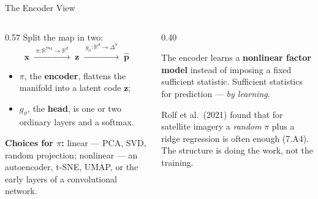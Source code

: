 \begin{frame}{The Encoder View}
\begin{columns}[T]
\begin{column}{0.57\textwidth}
\small
Split the map in two:
\[
  \mathbf{x}\;\xrightarrow{\;\pi:\mathbb{R}^{784}\to\mathbb{R}^{d}\;}\;\mathbf{z}\;\xrightarrow{\;g_\phi:\mathbb{R}^{d}\to\Delta^{9}\;}\;\hat{\mathbf{p}}
\]
\begin{itemize}\small\setlength{\itemsep}{1mm}
  \item $\pi$, the \textbf{encoder}, flattens the manifold into a latent code $\mathbf{z}$;
  \item $g_\phi$, the \textbf{head}, is one or two ordinary layers and a softmax.
\end{itemize}
\medskip

\textbf{Choices for $\pi$:} linear --- PCA, SVD, random projection; nonlinear --- an autoencoder, t-SNE, UMAP, or the early layers of a convolutional network.
\end{column}
\begin{column}{0.40\textwidth}
\begin{takeawaybox}[title=\textbf{The translation}]\small
The encoder learns a \textbf{nonlinear factor model} instead of imposing a fixed sufficient statistic.
\medskip
Sufficient statistics for prediction --- \emph{by learning}.
\end{takeawaybox}
\medskip
\begin{examplebox}\footnotesize
Rolf et al.\ (2021) found that for satellite imagery a \emph{random} $\pi$ plus a ridge regression is often enough (7.A4). The structure is doing the work, not the training.
\end{examplebox}
\end{column}
\end{columns}
\end{frame}

